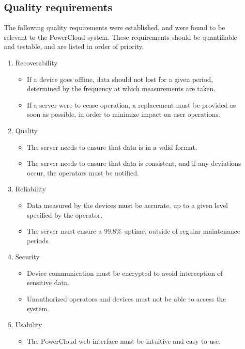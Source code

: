 \documentclass{article}
\begin{document}
	\newpage

	\subsection{Quality requirements}
	
	The following quality requirements were established, and were found to be relevant to the PowerCloud system. These requirements should be quantifiable and testable, and are listed in order of priority.
	
	\begin{enumerate}
		\item Recoverability
			\begin{itemize}
				\item If a device goes offline, data should not lost for a given period, determined by the frequency at which measurements are taken.
				\item If a server were to cease operation, a replacement must be provided as soon as possible, in order to minimize impact on user operations.
			\end{itemize}
		\item Quality
			\begin{itemize}
				\item The server needs to ensure that data is in a valid format.
				\item The server needs to ensure that data is consistent, and if any deviations occur, the operators must be notified.
			\end{itemize}
		\item Reliability
			\begin{itemize}
				\item Data measured by the devices must be accurate, up to a given level specified by the operator.
				\item The server must ensure a 99.8\% uptime, outside of regular maintenance periods.
			\end{itemize}
		\item Security
			\begin{itemize}
				\item Device communication must be encrypted to avoid interception of sensitive data.
				\item Unauthorized operators and devices must not be able to access the system.
			\end{itemize}
		\item Usability
			\begin{itemize}
				\item The PowerCloud web interface must be intuitive and easy to use.

\end{itemize}
\end{enumerate}
\end{document}

